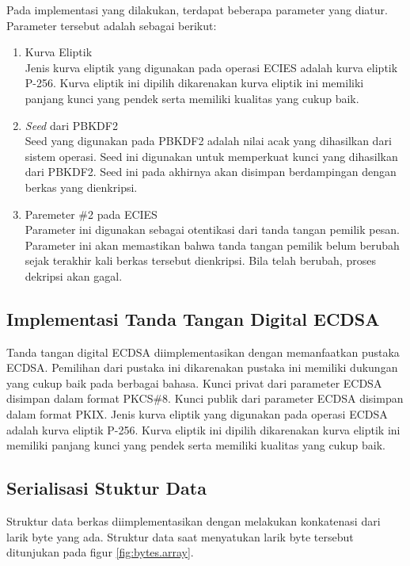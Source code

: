 \documentclass[conference]{IEEEtran}
\begin{document}
Pada implementasi yang dilakukan, terdapat beberapa parameter yang diatur. Parameter tersebut adalah sebagai berikut:

\begin{enumerate}
    \item Kurva Eliptik\\
    Jenis kurva eliptik yang digunakan pada operasi ECIES adalah kurva eliptik P-256. Kurva eliptik ini dipilih dikarenakan kurva eliptik ini memiliki panjang kunci yang pendek serta memiliki kualitas yang cukup baik.
    \item \emph{Seed} dari PBKDF2\\
    Seed yang digunakan pada PBKDF2 adalah nilai acak yang dihasilkan dari sistem operasi. Seed ini digunakan untuk memperkuat kunci yang dihasilkan dari PBKDF2. Seed ini pada akhirnya akan disimpan berdampingan dengan berkas yang dienkripsi.
    \item Paremeter \#2 pada ECIES\\
    Parameter ini digunakan sebagai otentikasi dari tanda tangan pemilik pesan. Parameter ini akan memastikan bahwa tanda tangan pemilik belum berubah sejak terakhir kali berkas tersebut dienkripsi. Bila telah berubah, proses dekripsi akan gagal.
\end{enumerate}

\subsection{Implementasi Tanda Tangan Digital ECDSA}

Tanda tangan digital ECDSA diimplementasikan dengan memanfaatkan pustaka ECDSA. Pemilihan dari pustaka ini dikarenakan pustaka ini memiliki dukungan yang cukup baik pada berbagai bahasa. Kunci privat dari parameter ECDSA disimpan dalam format PKCS\#8. Kunci publik dari parameter ECDSA disimpan dalam format PKIX. Jenis kurva eliptik yang digunakan pada operasi ECDSA adalah kurva eliptik P-256. Kurva eliptik ini dipilih dikarenakan kurva eliptik ini memiliki panjang kunci yang pendek serta memiliki kualitas yang cukup baik.

\subsection{Serialisasi Stuktur Data}

Struktur data berkas diimplementasikan dengan melakukan konkatenasi dari larik byte yang ada. Struktur data saat menyatukan larik byte tersebut ditunjukan pada figur \ref{fig:bytes.array}.
\end{document}
